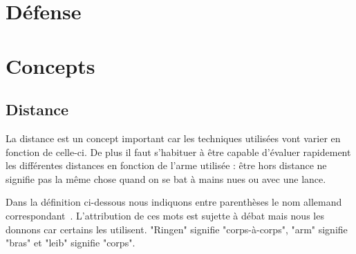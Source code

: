 \section{Défense}




\section{Concepts}







\subsection{Distance}


La distance est un concept important car les techniques utilisées vont varier en fonction de celle-ci.
De plus il faut s'habituer à être capable d'évaluer rapidement les différentes distances en fonction de l'arme utilisée : être hors distance ne signifie pas la même chose quand on se bat à mains nues ou avec une lance.

Dans la définition ci-dessous nous indiquons entre parenthèses le nom allemand correspondant~\cite{kronenburg:dijon:going_distance:2015}.
L'attribution de ces mots est sujette à débat mais nous les donnons car certains les utilisent.
"Ringen" signifie "corps-à-corps", "arm" signifie "bras" et "leib" signifie "corps".


